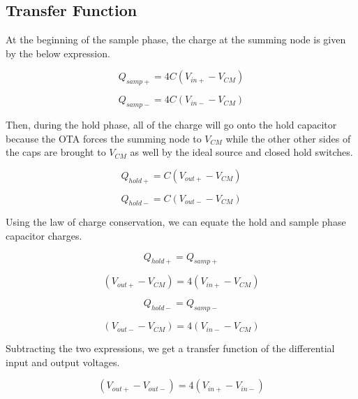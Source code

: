 \documentclass{article}
\begin{document}
\subsection{Transfer Function}
At the beginning of the sample phase, the charge at the summing node is given by the below expression.

\begin{equation}
Q_{samp+} = 4C\left(V_{in+}-V_{CM}\right)
\end{equation}

\begin{equation}
Q_{samp-} = 4C\left(V_{in-}-V_{CM}\right)
\end{equation}

Then, during the hold phase, all of the charge will go onto the hold capacitor because the OTA forces the summing node to $V_{CM}$ while the other other sides of the caps are brought to $V_{CM}$ as well by the ideal source and closed hold switches.

\begin{equation}
Q_{hold+} = C\left(V_{out+}-V_{CM}\right)
\end{equation}

\begin{equation}
Q_{hold-} = C\left(V_{out-}-V_{CM}\right)
\end{equation}

Using the law of charge conservation, we can equate the hold and sample phase capacitor charges.

\begin{equation}
Q_{hold+} = Q_{samp+}
\end{equation}

\begin{equation}
\left(V_{out+}-V_{CM}\right) = 4\left(V_{in+}-V_{CM}\right)
\end{equation}

\begin{equation}
Q_{hold-} = Q_{samp-}
\end{equation}

\begin{equation}
\left(V_{out-}-V_{CM}\right) = 4\left(V_{in-}-V_{CM}\right)
\end{equation}

Subtracting the two expressions, we get a transfer function of the differential input and output voltages.

\begin{equation}
\left(V_{out+}-V_{out-}\right) = 4\left(V_{in+}-V_{in-}\right)
\end{equation}
\end{document}
